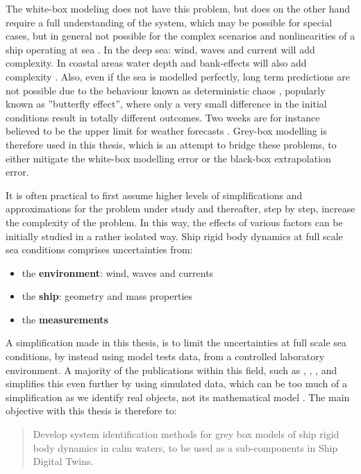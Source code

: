 The white-box modeling does not have this problem, but does on the other hand require a full understanding of the system, which may be possible for special cases, but in general not possible for the complex scenarios and nonlinearities of a ship operating at sea \cite{miller_ship_2021}. 
In the deep sea: wind, waves and current will add complexity. In coastal areas water depth and bank-effects will also add complexity \cite{nielsen_machine_2022}. 
Also, even if the sea is modelled perfectly, long term predictions are not possible due to the behaviour known as deterministic chaos \cite{lorenz_deterministic_1963}, popularly known as ''butterfly effect'', where only a very small difference in the initial conditions result in totally different outcomes. Two weeks are for instance believed to be the upper limit for weather forecasts  \cite{zhang_what_2019}. Grey-box modelling is therefore used in this thesis, which is an attempt to bridge these problems, to either mitigate the white-box modelling error or the black-box extrapolation error. 

It is often practical to first assume higher levels of simplifications and approximations for the problem under study and thereafter, step by step, increase the complexity of the problem. In this way, the effects of various factors can be initially studied in a rather isolated way. 
Ship rigid body dynamics at full scale sea conditions comprises uncertainties from:
\begin{itemize}
    \item the \textbf{environment}: wind, waves and currents
    \item the \textbf{ship}: geometry and mass properties
    \item the \textbf{measurements}
\end{itemize}

\noindent A simplification made in this thesis, is to limit the uncertainties at full scale sea conditions, by instead using model tests data, from a controlled laboratory environment. A majority of the publications within this field, such as \cite{shi_identification_2009}, \cite{perera_system_2015}, \cite{zhu_parameter_2017}, \cite{wang_parameter_2021} and \cite{xue_hydrodynamic_2020} simplifies this even further by using simulated data, which can be too much of a simplification as we identify real objects, not its mathematical model \cite{miller_ship_2021}.
The main objective with this thesis is therefore to:
\begin{quote} 
Develop system identification methods for grey box models of ship rigid body dynamics in calm waters, to be used as a sub-components in Ship Digital Twins. 
\end{quote}

